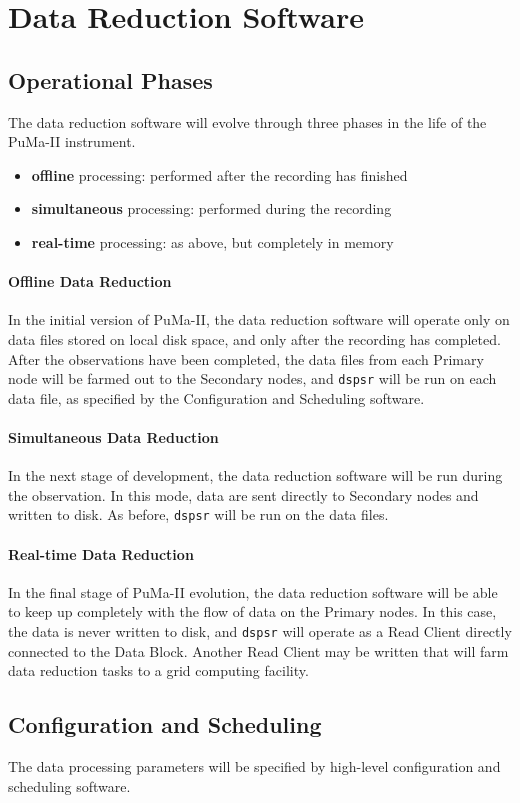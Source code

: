 \chapter{Data Reduction Software}

\section{Operational Phases}

The data reduction software will evolve through three phases in the life
of the PuMa-II instrument.

\begin{itemize}
\item {\bf offline} processing: performed after the recording has finished
\item {\bf simultaneous} processing: performed during the recording
\item {\bf real-time} processing: as above, but completely in memory
\end{itemize}

\subsubsection{Offline Data Reduction}

In the initial version of PuMa-II, the data reduction software will
operate only on data files stored on local disk space, and only after
the recording has completed.  After the observations have been
completed, the data files from each Primary node will be farmed out to
the Secondary nodes, and {\tt dspsr} will be run on each data file, as
specified by the Configuration and Scheduling software.

\subsubsection{Simultaneous Data Reduction}

In the next stage of development, the data reduction software will be
run during the observation.  In this mode, data are sent directly to
Secondary nodes and written to disk.  As before, {\tt dspsr} will be
run on the data files.

\subsubsection{Real-time Data Reduction}

In the final stage of PuMa-II evolution, the data reduction software
will be able to keep up completely with the flow of data on the
Primary nodes.  In this case, the data is never written to disk, and
{\tt dspsr} will operate as a Read Client directly connected to the
Data Block.  Another Read Client may be written that will farm data
reduction tasks to a grid computing facility.

\section{Configuration and Scheduling}

The data processing parameters will be specified by high-level
configuration and scheduling software.
